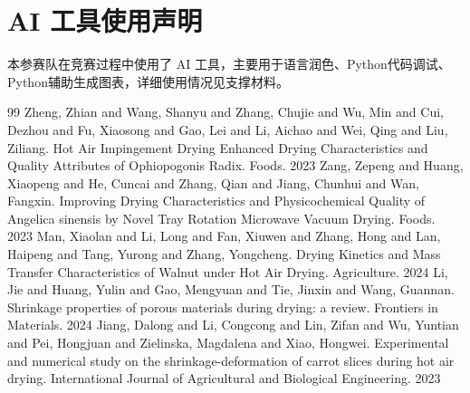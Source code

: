 \documentclass[12pt,a4paper]{ctexart}
\begin{document}
\begin{abstract}
\begin{small}
最后，本文通过解析级数解对照、网格与时间加密、独立实现复算和守恒性检验来核验结果。
灵敏度分析表明，烘干时长对表面传质系数并不敏感，主要由模型假设决定。



\noindent\textbf{关键词}：热风烘干；径向轴对称；有限体积法；移动边界；归一化坐标；参数灵敏度
\end{small}
\end{abstract}

\newpage












\section*{AI 工具使用声明}
本参赛队在竞赛过程中使用了 AI 工具，主要用于语言润色、Python代码调试、Python辅助生成图表，详细使用情况见支撑材料。

\begin{thebibliography}{99}
 Zheng, Zhian and Wang, Shanyu and Zhang, Chujie and Wu, Min and Cui, Dezhou and Fu, Xiaosong and Gao, Lei and Li, Aichao and Wei, Qing and Liu, Ziliang. Hot Air Impingement Drying Enhanced Drying Characteristics and Quality Attributes of Ophiopogonis Radix. Foods. 2023
 Zang, Zepeng and Huang, Xiaopeng and He, Cuncai and Zhang, Qian and Jiang, Chunhui and Wan, Fangxin. Improving Drying Characteristics and Physicochemical Quality of Angelica sinensis by Novel Tray Rotation Microwave Vacuum Drying. Foods. 2023
 Man, Xiaolan and Li, Long and Fan, Xiuwen and Zhang, Hong and Lan, Haipeng and Tang, Yurong and Zhang, Yongcheng. Drying Kinetics and Mass Transfer Characteristics of Walnut under Hot Air Drying. Agriculture. 2024
 Li, Jie and Huang, Yulin and Gao, Mengyuan and Tie, Jinxin and Wang, Guannan. Shrinkage properties of porous materials during drying: a review. Frontiers in Materials. 2024
 Jiang, Dalong and Li, Congcong and Lin, Zifan and Wu, Yuntian and Pei, Hongjuan and Zielinska, Magdalena and Xiao, Hongwei. Experimental and numerical study on the shrinkage-deformation of carrot slices during hot air drying. International Journal of Agricultural and Biological Engineering. 2023
\end{thebibliography}
\end{document}
